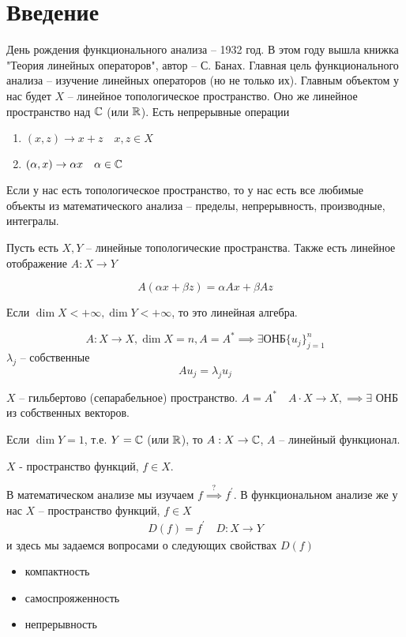 \documentclass[document]{subfiles}
\begin{document}
\chapter{Введение}
День рождения функционального анализа -- 1932 год. В этом году вышла книжка "Теория линейных операторов", автор -- С. Банах. Главная цель функционального анализа --
 изучение линейных операторов (но не только их).
Главным объектом у нас будет $X$ -- линейное топологическое пространство. Оно же линейное пространство над $\mathbb{C}$ (или $\mathbb{R}$).
Есть непрерывные операции
\begin{enumerate}
    \item $(x,z) \rightarrow x + z \quad x,z \in X$
    \item $(\alpha,x) \rightarrow \alpha x \quad \alpha \in \mathbb{C}$
\end{enumerate}
Если у нас есть топологическое пространство, то у нас есть все любимые объекты из математического анализа -- пределы, непрерывность, производные, интегралы.

Пусть есть $X,Y$ -- линейные топологические пространства. Также есть линейное отображение $A: X \rightarrow Y$
\begin{definition}
    \[ A(\alpha x + \beta z) = \alpha A x + \beta A z \]
\end{definition}

Если $\dim X < + \infty, \dim Y < + \infty$, то это линейная алгебра.

\[A: X \rightarrow X, \dim X = n, A = A^* \implies \exists \text {ОНБ} \{u_j\}_{j=1}^n \]
$\lambda_j$ -- собственные 
\[ A u_j = \lambda_j u_j \]
\begin{theorem}[Гильберт]
    $X$ -- гильбертово (сепарабельное) пространство.
    $A = A^* \quad A \cdot X \rightarrow X, \implies \exists$ ОНБ из собственных векторов.
\end{theorem}

Если $\dim Y = 1$, т.е. $Y = \mathbb{C}$ (или $\mathbb{R}$), то $A: X \rightarrow \mathbb{C}$, $A$ -- линейный функционал.

$X$ - пространство функций, $f \in X$.

В математическом анализе мы изучаем $f \stackrel{?}{\implies} f^\prime$.
В функциональном анализе же у нас $X$ -- пространство функций, $f \in X$
\begin{gather}
    D(f) =  f^\prime \quad D: X \rightarrow Y
\end{gather}
и здесь мы задаемся вопросами о следующих свойствах $D(f)$
\begin{itemize}
    \item компактность
    \item самоспрояженность
    \item непрерывность
\end{itemize}
\end{document}
